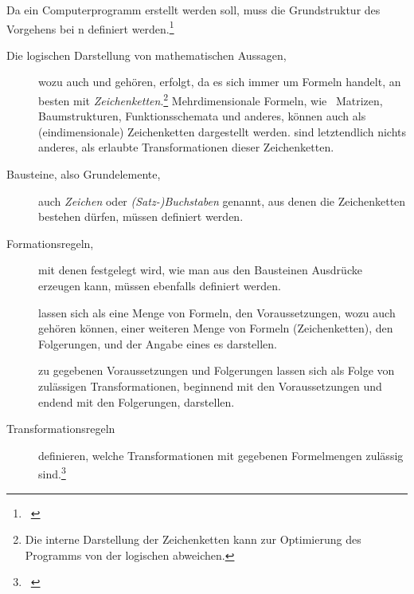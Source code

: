 Da ein Computerprogramm erstellt werden soll, muss die Grundstruktur des Vorgehens bei n definiert werden.\footnote{\seename~\cite{bib:Kalkuel}}

\begin{description}
	\item[Die logischen Darstellung von mathematischen Aussagen,] wozu auch  und  gehören, erfolgt, da es sich immer um Formeln handelt, an besten mit \emph{Zeichenketten}.\footnote{%
		Die interne Darstellung der Zeichenketten kann zur Optimierung des Programms von der logischen abweichen.%
	}
	Mehrdimensionale Formeln, wie \textzB\ Matrizen, Baumstrukturen, Funktionsschemata und anderes, können auch als (eindimensionale) Zeichenketten dargestellt werden.
	 sind letztendlich nichts anderes, als erlaubte Transformationen dieser Zeichenketten.
	\item[Bausteine, also Grundelemente,] auch \emph{Zeichen} oder \emph{(Satz-)Buchstaben} genannt, aus denen die Zeichenketten bestehen dürfen, müssen definiert werden.
	\item[Formationsregeln,] mit denen festgelegt wird, wie man aus den Bausteinen Ausdrücke erzeugen kann, müssen ebenfalls definiert werden.
	\item[] lassen sich als eine Menge von Formeln, den Voraussetzungen, wozu auch  gehören können, einer weiteren Menge von Formeln (Zeichenketten), den Folgerungen, und der Angabe eines es darstellen.
	\item[] zu gegebenen Voraussetzungen und Folgerungen lassen sich als Folge von zulässigen Transformationen, beginnend mit den Voraussetzungen und endend mit den Folgerungen, darstellen.
	\item[Transformationsregeln] definieren, welche Transformationen mit gegebenen Formelmengen zulässig sind.\footnote{\seename~\cite{bib:Rautenberg,bib:Schlussregel,bib:NatuerlichesSchliessen}}
\end{description}

\Endchapter
